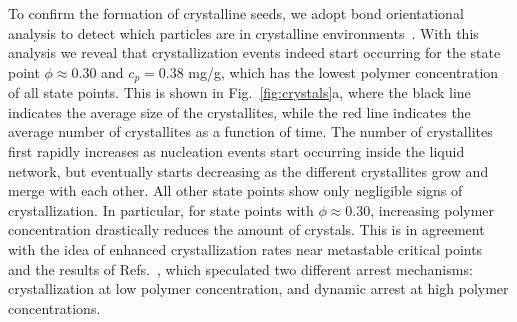 \documentclass[preprint,amsmath,amssymb,superscriptaddress]{revtex4}
\begin{document}
To confirm the formation of crystalline seeds, we adopt bond orientational analysis to detect which particles are in crystalline environments~\cite{russo2013interplay}. 
With this analysis we reveal that crystallization events indeed start occurring for the state point $\phi\approx 0.30$ and $c_p=0.38$ mg/g, which has the lowest
polymer concentration of all state points. This is shown in Fig.~\ref{fig:crystals}a, where the black line indicates the average size of the crystallites, 
while the red line indicates the average number of crystallites as a function of time. The number of crystallites first rapidly increases as nucleation events
start occurring inside the liquid network, but eventually starts decreasing as the different crystallites grow and merge with each other.
All other state points show only negligible signs of crystallization. In particular, for state points with $\phi\approx 0.30$, increasing
polymer concentration drastically reduces the amount of crystals. This is in agreement with the
idea of enhanced crystallization rates near metastable critical points~\cite{ten1997enhancement,olmsted1998spinodal} and the
results of Refs.~\cite{soga1999metastable,fortini2008crystallization,perez2011pathways},
which speculated two different arrest mechanisms: crystallization at low polymer concentration, and dynamic arrest at high polymer concentrations.
\end{document}
